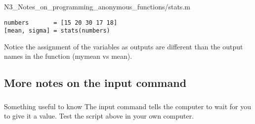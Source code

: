 \documentclass[11pt]{beamer}
\begin{document}
\begin{frame}[fragile]
	\frametitle{}
	\vspace{-3mm}
	 {N3_Notes_on_programming_anonymous_functions/stats.m}
	\vspace{-3mm}	
\begin{lstlisting}[caption = {Script}]
numbers       = [15 20 30 17 18]
[mean, sigma] = stats(numbers)
\end{lstlisting}
{\small Notice the assignment of the variables as outputs are different than the output names in the function (mymean vs mean). }	
\end{frame}

\subsection{More notes on the input command}

\begin{frame}
	\frametitle{\subsecname}
	
	
	
	\begin{exampleblock}{Something useful to know}
		The input command tells the computer to wait for you to give it a value. Test the script above in your own computer. 
	\end{exampleblock}
\end{frame}
\end{document}
